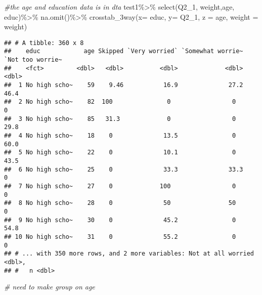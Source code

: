 \documentclass[
]{article}
\newenvironment{Shaded}{\begin{snugshade}}{\end{snugshade}}
\newcommand{\AttributeTok}[1]{\textcolor[rgb]{0.77,0.63,0.00}{#1}}
\newcommand{\CommentTok}[1]{\textcolor[rgb]{0.56,0.35,0.01}{\textit{#1}}}
\newcommand{\FunctionTok}[1]{\textcolor[rgb]{0.00,0.00,0.00}{#1}}
\newcommand{\NormalTok}[1]{#1}
\newcommand{\SpecialCharTok}[1]{\textcolor[rgb]{0.00,0.00,0.00}{#1}}
\begin{document}
\begin{Shaded}
\begin{Highlighting}[]
\CommentTok{\#the age and education data is in dta}
\NormalTok{test1}\SpecialCharTok{\%\textgreater{}\%}
  \FunctionTok{select}\NormalTok{(Q2\_1, weight,age, educ)}\SpecialCharTok{\%\textgreater{}\%}
  \FunctionTok{na.omit}\NormalTok{()}\SpecialCharTok{\%\textgreater{}\%}
  \FunctionTok{crosstab\_3way}\NormalTok{(}\AttributeTok{x=}\NormalTok{ educ, }\AttributeTok{y=}\NormalTok{ Q2\_1, }\AttributeTok{z =}\NormalTok{ age, }\AttributeTok{weight =}\NormalTok{ weight)}
\end{Highlighting}
\end{Shaded}

\begin{verbatim}
## # A tibble: 360 x 8
##    educ            age Skipped `Very worried` `Somewhat worrie~ `Not too worrie~
##    <fct>         <dbl>   <dbl>          <dbl>             <dbl>            <dbl>
##  1 No high scho~    59    9.46           16.9              27.2             46.4
##  2 No high scho~    82  100               0                 0                0  
##  3 No high scho~    85   31.3             0                 0               29.8
##  4 No high scho~    18    0              13.5               0               60.0
##  5 No high scho~    22    0              10.1               0               43.5
##  6 No high scho~    25    0              33.3              33.3              0  
##  7 No high scho~    27    0             100                 0                0  
##  8 No high scho~    28    0              50                50                0  
##  9 No high scho~    30    0              45.2               0               54.8
## 10 No high scho~    31    0              55.2               0                0  
## # ... with 350 more rows, and 2 more variables: Not at all worried <dbl>,
## #   n <dbl>
\end{verbatim}

\begin{Shaded}
\begin{Highlighting}[]
\CommentTok{\# need to make group on age}
\end{Highlighting}
\end{Shaded}
\end{document}
